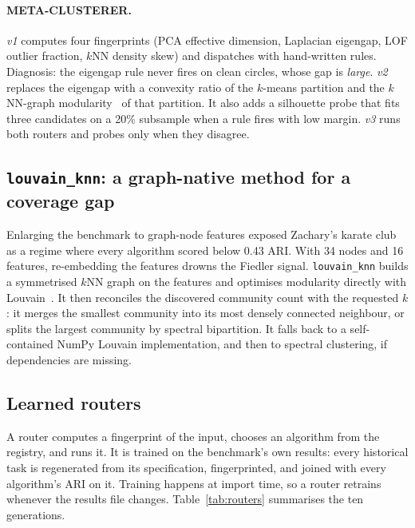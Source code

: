 \documentclass[11pt,a4paper]{article}
\newcommand{\code}[1]{\texttt{#1}}
\begin{document}
\paragraph{META-CLUSTERER.}
\emph{v1} computes four fingerprints (PCA effective dimension, Laplacian
eigengap, LOF outlier fraction, $k$NN density skew) and dispatches with
hand-written rules. Diagnosis: the eigengap rule never fires on clean circles,
whose gap is \emph{large}. \emph{v2} replaces the eigengap with a convexity
ratio of the $k$-means partition and the $k$NN-graph
modularity~\cite{newman2006modularity} of that partition. It also adds a
silhouette probe that fits three candidates on a 20\% subsample when a rule
fires with low margin. \emph{v3} runs both routers and probes only when they
disagree.

\subsection{\texorpdfstring{\code{louvain\_knn}}{louvain\_knn}: a graph-native method for a coverage gap}
Enlarging the benchmark to graph-node features exposed Zachary's karate
club~\cite{zachary1977information} as a regime where every algorithm scored
below 0.43 ARI. With 34 nodes and 16 features, re-embedding the features
drowns the Fiedler signal. \code{louvain\_knn} builds a symmetrised $k$NN
graph on the features and optimises modularity directly with
Louvain~\cite{blondel2008fast}. It then reconciles the discovered community
count with the requested $k$: it merges the smallest community into its most
densely connected neighbour, or splits the largest community by spectral
bipartition. It falls back to a self-contained NumPy Louvain implementation,
and then to spectral clustering, if dependencies are missing.

\subsection{Learned routers}\label{sec:routers}
A router computes a fingerprint of the input, chooses an algorithm from the
registry, and runs it. It is trained on the benchmark's own results: every
historical task is regenerated from its specification, fingerprinted, and
joined with every algorithm's ARI on it. Training happens at import time, so
a router retrains whenever the results file changes. Table~\ref{tab:routers}
summarises the ten generations.
\end{document}
